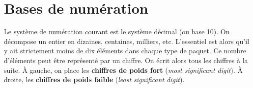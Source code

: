 \def\xxactivite{Cours}

\fichefalse \proftrue \tdfalse \courstrue

\def\xxnumchapitre{Chapitre 2 \vspace{.2cm}}
\def\xxchapitre{\hspace{.12cm} Représentation des nombres en mémoire}

\def\xxcompetences{%
\textsl{%
\textbf{Savoirs et compétences :}\\
\begin{itemize}[label=\ding{112},font=\color{bleuxp}] 
\item Représentation des entiers positifs sur des mots de taille fixe.
\item Représentation des entiers signés sur des mots de taille fixe.
\item Entiers multi-précision de Python.
\item Distinction entre nombres réels, décimaux et flottants.
\item Représentation entre nombres réels, décimaux et flottants.
\item Représentation des flottants sur des mots de taille fixe. Notion de mantisse, d'exposant. 
\item Précision des calculs en flottants.
\end{itemize}
}}

\def\xxfigures{
}%


\setlength{\columnseprule}{.1pt}

\vspace{2cm}
\pagestyle{fancy}
\thispagestyle{plain}


\section{Bases de numération}

Le système de numération courant est le système décimal (ou base 10). 
On décompose un entier en dizaines, centaines, milliers, etc. 
L'essentiel est alors qu'il y ait strictement moins de dix éléments dans chaque type de paquet. Ce nombre d'éléments peut être représenté par un chiffre.
On écrit alors tous les chiffres à la suite. À gauche, on place les \textbf{chiffres de poids fort} (\textit{most significant digit}). À droite, les \textbf{chiffres de poids faible}  (\textit{least significant digit}).

